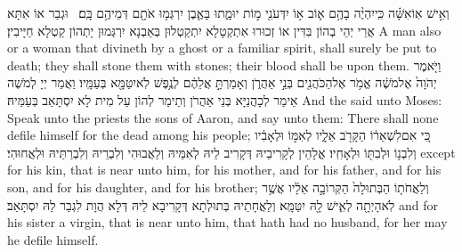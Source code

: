 {וְאִ֣ישׁ אֽוֹ\maqqaf אִשָּׁ֗ה כִּֽי\maqqaf יִהְיֶ֨ה בָהֶ֥ם א֛וֹב א֥וֹ יִדְּעֹנִ֖י מ֣וֹת יוּמָ֑תוּ בָּאֶ֛בֶן יִרְגְּמ֥וּ אֹתָ֖ם דְּמֵיהֶ֥ם בָּֽם׃ \petucha }
{וּגְבַר אוֹ אִתָּא אֲרֵי יְהֵי בְהוֹן בִּדִּין אוֹ זְכוּרוּ אִתְקְטָלָא יִתְקַטְלוּן בְּאַבְנָא יִרְגְּמוּן יָתְהוֹן קַטְלָא חַיָּיבִין׃}
{A man also or a woman that divineth by a ghost or a familiar spirit, shall surely be put to death; they shall stone them with stones; their blood shall be upon them.}{}
\newperek
{}
{וַיֹּ֤אמֶר יְהֹוָה֙ אֶל\maqqaf מֹשֶׁ֔ה אֱמֹ֥ר אֶל\maqqaf הַכֹּהֲנִ֖ים בְּנֵ֣י אַהֲרֹ֑ן וְאָמַרְתָּ֣ אֲלֵהֶ֔ם לְנֶ֥פֶשׁ לֹֽא\maqqaf יִטַּמָּ֖א בְּעַמָּֽיו׃}
{וַאֲמַר יְיָ לְמֹשֶׁה אֵימַר לְכָהֲנַיָּא בְּנֵי אַהֲרֹן וְתֵימַר לְהוֹן עַל מִית לָא יִסְתָּאַב בְּעַמֵּיהּ׃}
{And the \lord\space said unto Moses: Speak unto the priests the sons of Aaron, and say unto them: There shall none defile himself for the dead among his people;}{}
{כִּ֚י אִם\maqqaf לִשְׁאֵר֔וֹ הַקָּרֹ֖ב אֵלָ֑יו לְאִמּ֣וֹ וּלְאָבִ֔יו וְלִבְנ֥וֹ וּלְבִתּ֖וֹ וּלְאָחִֽיו׃}
{אֱלָהֵין לְקָרִיבֵיהּ דְּקָרִיב לֵיהּ לְאִמֵּיהּ וְלַאֲבוּהִי וְלִבְרֵיהּ וְלִבְרַתֵּיהּ וּלְאֲחוּהִי׃}
{except for his kin, that is near unto him, for his mother, and for his father, and for his son, and for his daughter, and for his brother;}{}
{וְלַאֲחֹת֤וֹ הַבְּתוּלָה֙ הַקְּרוֹבָ֣ה אֵלָ֔יו אֲשֶׁ֥ר לֹֽא\maqqaf הָיְתָ֖ה לְאִ֑ישׁ לָ֖הּ יִטַּמָּֽא׃}
{וְלַאֲחָתֵיהּ בְּתוּלְתָא דְּקָרִיבָא לֵיהּ דְּלָא הֲוָת לִגְבַר לַהּ יִסְתָּאַב׃}
{and for his sister a virgin, that is near unto him, that hath had no husband, for her may he defile himself.}{}
